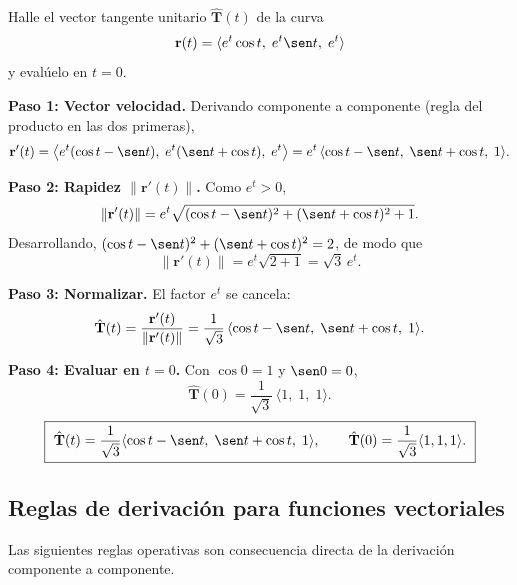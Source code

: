 \begin{prob}
Halle el vector tangente unitario $\hat{\mathbf{T}}(t)$ de la curva
\[
  \mathbf{r}(t)=\langle e^{t}\cos t,\; e^{t}\sen t,\; e^{t}\rangle
\]
y evalúelo en $t=0$.
\begin{myproof}
\textbf{Paso 1: Vector velocidad.}
Derivando componente a componente (regla del producto en las dos primeras),
\[
  \mathbf{r}'(t)=\big\langle e^{t}(\cos t-\sen t),\;
                             e^{t}(\sen t+\cos t),\;
                             e^{t}\big\rangle
              = e^{t}\,\langle \cos t-\sen t,\; \sen t+\cos t,\; 1\rangle.
\]

\textbf{Paso 2: Rapidez $\|\mathbf{r}'(t)\|$.}
Como $e^{t}>0$,
\[
  \|\mathbf{r}'(t)\|
  = e^{t}\sqrt{(\cos t-\sen t)^2+(\sen t+\cos t)^2+1}.
\]
Desarrollando, $(\cos t-\sen t)^2+(\sen t+\cos t)^2=2$, de modo que
\[
  \|\mathbf{r}'(t)\|=e^{t}\sqrt{2+1}=\sqrt{3}\,e^{t}.
\]

\textbf{Paso 3: Normalizar.}
El factor $e^{t}$ se cancela:
\[
  \hat{\mathbf{T}}(t)=\frac{\mathbf{r}'(t)}{\|\mathbf{r}'(t)\|}
  =\frac{1}{\sqrt{3}}\,\langle \cos t-\sen t,\; \sen t+\cos t,\; 1\rangle.
\]

\textbf{Paso 4: Evaluar en $t=0$.}
Con $\cos 0=1$ y $\sen 0=0$,
\[
  \hat{\mathbf{T}}(0)=\frac{1}{\sqrt{3}}\,\langle 1,\;1,\;1\rangle.
\]
\[
  \boxed{\ \hat{\mathbf{T}}(t)
  =\frac{1}{\sqrt{3}}\langle \cos t-\sen t,\; \sen t+\cos t,\; 1\rangle,
  \qquad
  \hat{\mathbf{T}}(0)=\frac{1}{\sqrt{3}}\langle 1,1,1\rangle.\ }
\]
\end{myproof}
\end{prob}

\subsection{Reglas de derivación para funciones vectoriales}

Las siguientes reglas operativas son consecuencia directa de la
derivación componente a componente.

